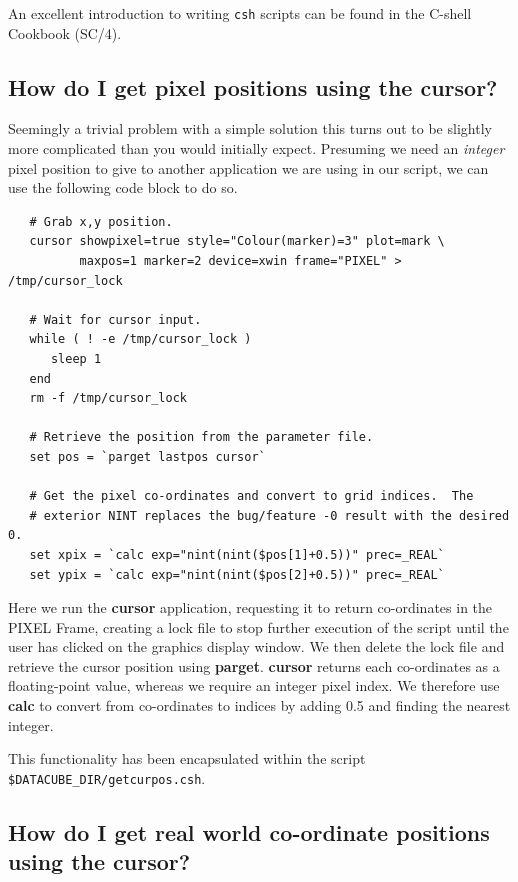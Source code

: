 \documentclass[twoside,11pt]{article}
\newcommand{\xref}[3]{#1}
\begin{document}
{An excellent introduction to writing {\tt csh} scripts can be found in
the \xref{C-shell Cookbook}{sc4}{} (SC/4).

\subsection{How do I get pixel positions using the cursor?}

Seemingly a trivial problem with a simple solution this turns out to
be slightly more complicated than you would initially expect.
Presuming we need an {\em integer} pixel position to give to another
application we are using in our script, we can use the following code
block to do so.

\small\begin{verbatim}
   # Grab x,y position.
   cursor showpixel=true style="Colour(marker)=3" plot=mark \
          maxpos=1 marker=2 device=xwin frame="PIXEL" > /tmp/cursor_lock

   # Wait for cursor input.
   while ( ! -e /tmp/cursor_lock )
      sleep 1
   end
   rm -f /tmp/cursor_lock

   # Retrieve the position from the parameter file.
   set pos = `parget lastpos cursor`

   # Get the pixel co-ordinates and convert to grid indices.  The
   # exterior NINT replaces the bug/feature -0 result with the desired 0.
   set xpix = `calc exp="nint(nint($pos[1]+0.5))" prec=_REAL`
   set ypix = `calc exp="nint(nint($pos[2]+0.5))" prec=_REAL`
\end{verbatim}\normalsize

Here we run the \xref{{\bf cursor}}{sun95}{CURSOR} application, requesting
it to return co-ordinates in the \xref{PIXEL Frame}{sun95}{se_wcsuse},
creating a lock file to stop further execution of the script until the
user has clicked on the graphics display window.  We then delete the
lock file and retrieve the cursor position using
\xref{{\bf parget}}{sun95}{PARGET}.  {\bf cursor} returns each co-ordinates as
a floating-point value, whereas we require an integer pixel index.  We
therefore use \xref{{\bf calc}}{sun95}{CALC} to convert from co-ordinates to
indices by adding 0.5 and finding the nearest integer.

This functionality has been encapsulated within the script
{\tt \$DATACUBE\_DIR/getcurpos.csh}.

\subsection{How do I get real world co-ordinate positions using the cursor?}

}
\end{document}
